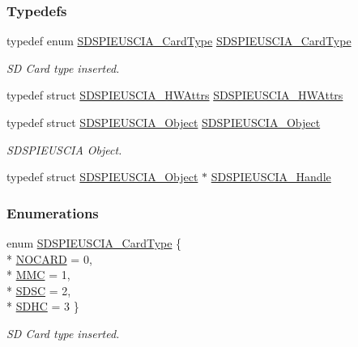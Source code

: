 \subsubsection*{Typedefs}
\begin{DoxyCompactItemize}
\item 
typedef enum \hyperlink{_s_d_s_p_i_e_u_s_c_i_a_8h_aaf384a8a07d5fb92b9ba72250174d577}{S\-D\-S\-P\-I\-E\-U\-S\-C\-I\-A\-\_\-\-Card\-Type} \hyperlink{_s_d_s_p_i_e_u_s_c_i_a_8h_a362d5b7bf44624901c58b48939699cd4}{S\-D\-S\-P\-I\-E\-U\-S\-C\-I\-A\-\_\-\-Card\-Type}
\begin{DoxyCompactList}\small\item\em S\-D Card type inserted. \end{DoxyCompactList}\item 
typedef struct \hyperlink{struct_s_d_s_p_i_e_u_s_c_i_a___h_w_attrs}{S\-D\-S\-P\-I\-E\-U\-S\-C\-I\-A\-\_\-\-H\-W\-Attrs} \hyperlink{_s_d_s_p_i_e_u_s_c_i_a_8h_a5648f15a35bdad301d31c6874b20ebc5}{S\-D\-S\-P\-I\-E\-U\-S\-C\-I\-A\-\_\-\-H\-W\-Attrs}
\item 
typedef struct \hyperlink{struct_s_d_s_p_i_e_u_s_c_i_a___object}{S\-D\-S\-P\-I\-E\-U\-S\-C\-I\-A\-\_\-\-Object} \hyperlink{_s_d_s_p_i_e_u_s_c_i_a_8h_ab597a53cdfa290295a3d4cf1b0a1f4f0}{S\-D\-S\-P\-I\-E\-U\-S\-C\-I\-A\-\_\-\-Object}
\begin{DoxyCompactList}\small\item\em S\-D\-S\-P\-I\-E\-U\-S\-C\-I\-A Object. \end{DoxyCompactList}\item 
typedef struct \hyperlink{struct_s_d_s_p_i_e_u_s_c_i_a___object}{S\-D\-S\-P\-I\-E\-U\-S\-C\-I\-A\-\_\-\-Object} $\ast$ \hyperlink{_s_d_s_p_i_e_u_s_c_i_a_8h_a70683fd7da45849d86266f7af970e6c8}{S\-D\-S\-P\-I\-E\-U\-S\-C\-I\-A\-\_\-\-Handle}
\end{DoxyCompactItemize}
\subsubsection*{Enumerations}
\begin{DoxyCompactItemize}
\item 
enum \hyperlink{_s_d_s_p_i_e_u_s_c_i_a_8h_aaf384a8a07d5fb92b9ba72250174d577}{S\-D\-S\-P\-I\-E\-U\-S\-C\-I\-A\-\_\-\-Card\-Type} \{ \\*
\hyperlink{_s_d_s_p_i_e_u_s_c_i_a_8h_aaf384a8a07d5fb92b9ba72250174d577a422cdc20ba86c8cdcf1f0fd2318a1cfc}{N\-O\-C\-A\-R\-D} = 0, 
\\*
\hyperlink{_s_d_s_p_i_e_u_s_c_i_a_8h_aaf384a8a07d5fb92b9ba72250174d577aa7d8fca3406f36682514f0384d910fac}{M\-M\-C} = 1, 
\\*
\hyperlink{_s_d_s_p_i_e_u_s_c_i_a_8h_aaf384a8a07d5fb92b9ba72250174d577a87550a2102744c14e5e2e0ed39cc04b2}{S\-D\-S\-C} = 2, 
\\*
\hyperlink{_s_d_s_p_i_e_u_s_c_i_a_8h_aaf384a8a07d5fb92b9ba72250174d577ab27db2a19a825c3e6f1513cdab7c81ea}{S\-D\-H\-C} = 3
 \}
\begin{DoxyCompactList}\small\item\em S\-D Card type inserted. \end{DoxyCompactList}\end{DoxyCompactItemize}
